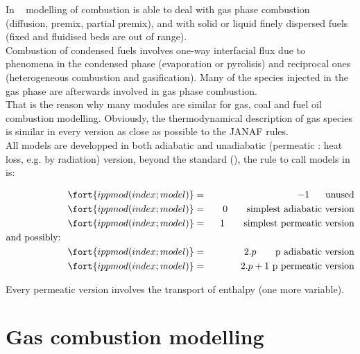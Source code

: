 In \CS~ modelling of combustion is able to deal with gas phase combustion
(diffusion, premix, partial premix), and with solid or liquid finely dispersed
fuels (fixed and fluidised beds are out of range).\\
Combustion of condensed fuels involves one-way interfacial flux due to phenomena
in the condensed phase (evaporation or pyrolisis) and reciprocal ones
(heterogeneous combustion and gasification). Many of the species injected in the
gas phase are afterwards involved in
gas phase combustion.\\
That is the reason why many modules are similar for gas, coal and fuel oil
combustion modelling. Obviously, the thermodynamical description of gas
species is similar in every version as close as possible to the JANAF rules.\\
All models are developped in both adiabatic and unadiabatic (permeatic : heat
loss, e.g. by radiation) version, beyond the standard (), the
rule to call models in  is:

\begin{eqnarray}
\fort{ippmod(index ; model)}  &=&     -1   ~~\quad \text{unused}                     \nonumber \\
\fort{ippmod(index ; model)}  &=& ~~   0  ~~~\quad \text{simplest adiabatic version} \nonumber \\
\fort{ippmod(index ; model)}  &=& ~~  1  ~~~\quad \text{simplest permeatic version}  \label{Eqs_00A}\\
\text{and possibly:}\qquad\qquad\qquad\qquad\qquad\qquad\qquad \nonumber & &\\
\fort{ippmod(index ; model)}  &=&  2.p    \qquad \text{p} ~\text{adiabatic version}  \nonumber \\
\fort{ippmod(index ; model)}  &=&  2.p+1 ~       \text{p} ~\text{permeatic version}  \nonumber
\end{eqnarray}


Every permeatic version involves the transport of enthalpy (one more variable).

\section*{Gas combustion modelling}


